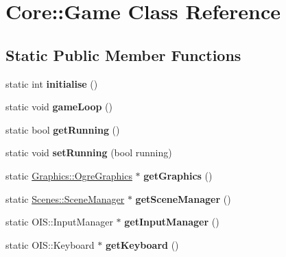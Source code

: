 \hypertarget{class_core_1_1_game}{\section{Core\-:\-:Game Class Reference}
\label{class_core_1_1_game}
}
\subsection*{Static Public Member Functions}
\begin{DoxyCompactItemize}
\item 
\hypertarget{class_core_1_1_game_a776a825379f2dc026358b5f278500c90}{static int {\bfseries initialise} ()}\label{class_core_1_1_game_a776a825379f2dc026358b5f278500c90}

\item 
\hypertarget{class_core_1_1_game_aede5f46c8c7bbbaf8459eeec397a11e7}{static void {\bfseries game\-Loop} ()}\label{class_core_1_1_game_aede5f46c8c7bbbaf8459eeec397a11e7}

\item 
\hypertarget{class_core_1_1_game_af11feb29c5399b360bd5740d0fd1b5d4}{static bool {\bfseries get\-Running} ()}\label{class_core_1_1_game_af11feb29c5399b360bd5740d0fd1b5d4}

\item 
\hypertarget{class_core_1_1_game_a80dd6cde2747fad68d18719f3dd1cbe1}{static void {\bfseries set\-Running} (bool running)}\label{class_core_1_1_game_a80dd6cde2747fad68d18719f3dd1cbe1}

\item 
\hypertarget{class_core_1_1_game_ad7fa5bdf71ea8e2ac3057a54e50b087e}{static \hyperlink{class_graphics_1_1_ogre_graphics}{Graphics\-::\-Ogre\-Graphics} $\ast$ {\bfseries get\-Graphics} ()}\label{class_core_1_1_game_ad7fa5bdf71ea8e2ac3057a54e50b087e}

\item 
\hypertarget{class_core_1_1_game_a103f4fe333cd90ba01dd25073fd3143e}{static \hyperlink{class_scenes_1_1_scene_manager}{Scenes\-::\-Scene\-Manager} $\ast$ {\bfseries get\-Scene\-Manager} ()}\label{class_core_1_1_game_a103f4fe333cd90ba01dd25073fd3143e}

\item 
\hypertarget{class_core_1_1_game_a9f0e2e31c03a7e28012f16d9e57acbd1}{static O\-I\-S\-::\-Input\-Manager $\ast$ {\bfseries get\-Input\-Manager} ()}\label{class_core_1_1_game_a9f0e2e31c03a7e28012f16d9e57acbd1}

\item 
\hypertarget{class_core_1_1_game_accf9a2d029a5e29750063f17afd34702}{static O\-I\-S\-::\-Keyboard $\ast$ {\bfseries get\-Keyboard} ()}\label{class_core_1_1_game_accf9a2d029a5e29750063f17afd34702}


\end{DoxyCompactItemize}
